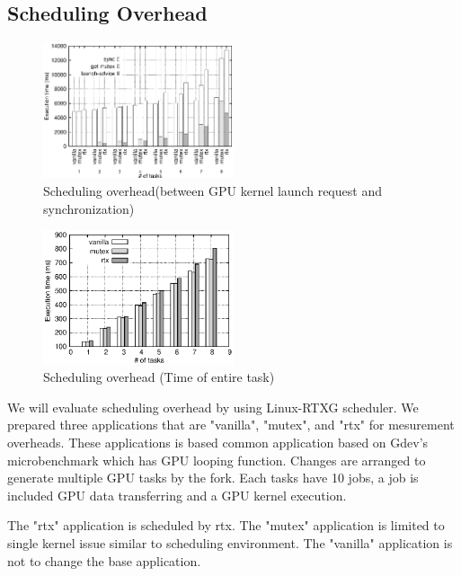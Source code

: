 \subsection{Scheduling Overhead}\label{sec:eval:sched_overhead}

\begin{figure}[t]
\begin{center}
\includegraphics[width=0.5\textwidth]{img/sum_task_fp.eps}
\caption{Scheduling overhead(between GPU kernel launch request and synchronization)}
\end{center}
\label{fig:fp_overhead}
\end{figure}

\begin{figure}[t]
\begin{center}
\includegraphics[width=0.5\textwidth]{img/sum_task.eps}
\caption{Scheduling overhead (Time of entire task)}
\end{center}
\label{fig:fp_overhead}
\end{figure}

We will evaluate scheduling overhead by using Linux-RTXG scheduler.
We prepared three applications that are "vanilla", "mutex", and "rtx" for mesurement overheads.
These applications is based common application based on Gdev's microbenchmark which has GPU looping function.
Changes are arranged to generate multiple GPU tasks by the fork.
Each tasks have 10 jobs, a job is included GPU data transferring and a GPU kernel execution.

The "rtx" application is scheduled by rtx.
The "mutex" application  is limited to single kernel issue similar to scheduling environment.
The "vanilla" application is not to change the base application.

